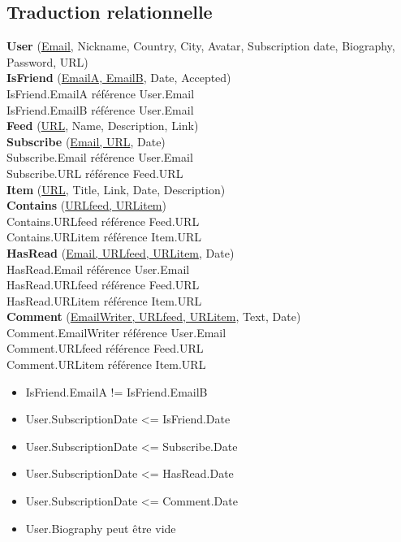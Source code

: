\documentclass[11pt]{article}
\begin{document}
\subsection{Traduction relationnelle}
\noindent \textbf{User} (\underline{Email}, Nickname, Country, City, Avatar, Subscription date, Biography, Password, URL) \\
 \newline
\textbf{IsFriend} (\underline{EmailA, EmailB}, Date, Accepted) \\
	IsFriend.EmailA référence User.Email \\
	IsFriend.EmailB référence User.Email \\
\newline
\textbf{Feed} (\underline{URL}, Name, Description, Link) \\
\newline
\textbf{Subscribe} (\underline{Email, URL}, Date) \\
	Subscribe.Email référence User.Email \\
	Subscribe.URL référence Feed.URL \\
\newline
\textbf{Item} (\underline{URL}, Title, Link, Date, Description) \\
\newline
\textbf{Contains} (\underline{URLfeed, URLitem}) \\
	Contains.URLfeed référence Feed.URL \\
	Contains.URLitem référence Item.URL \\
\newline
\textbf{HasRead} (\underline{Email, URLfeed, URLitem}, Date) \\
	HasRead.Email référence User.Email \\
	HasRead.URLfeed référence Feed.URL \\
	HasRead.URLitem référence Item.URL \\
\newline
\textbf{Comment} (\underline{EmailWriter, URLfeed, URLitem}, Text, Date) \\
	Comment.EmailWriter référence User.Email \\
	Comment.URLfeed référence Feed.URL \\
	Comment.URLitem référence Item.URL \\
\begin{itemize}
\item{IsFriend.EmailA != IsFriend.EmailB}
\item{User.SubscriptionDate <= IsFriend.Date}
\item{User.SubscriptionDate <= Subscribe.Date}
\item{User.SubscriptionDate <= HasRead.Date}
\item{User.SubscriptionDate <= Comment.Date}
\item{User.Biography peut être vide}
\end{itemize}
\end{document}
